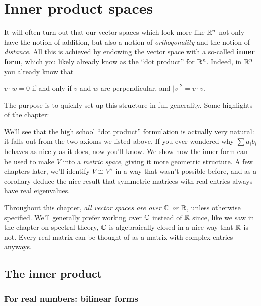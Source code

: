\chapter{Inner product spaces}
It will often turn out that our vector spaces which look more like $\mathbb R^n$
not only have the notion of addition, but also a notion of \emph{orthogonality}
and the notion of \emph{distance}.
All this is achieved by endowing the vector space with a so-called \textbf{inner form},
which you likely already know as the ``dot product'' for $\mathbb R^n$.
Indeed, in $\mathbb R^n$ you already know that
\begin{itemize}
	\ii $v \cdot w = 0$ if and only if $v$ and $w$ are perpendicular, and
	\ii $|v|^2 = v \cdot v$.
\end{itemize}
The purpose is to quickly set up this structure in full generality.
Some highlights of the chapter:
\begin{itemize}
	\ii We'll see that the high school ``dot product''
	formulation is actually very natural:
	it falls out from the two axioms we listed above.
	If you ever wondered why $\sum a_i b_i$ behaves as nicely as it does,
	now you'll know.
	\ii We show how the inner form can be used to make $V$ into a \emph{metric space},
	giving it more geometric structure.
	\ii A few chapters later,
	we'll identify $V \cong V^\vee$ in a way that wasn't possible before,
	and as a corollary deduce the nice result that
	symmetric matrices with real entries
	always have real eigenvalues.
\end{itemize}

Throughout this chapter, \emph{all vector spaces are over $\mathbb C$ or $\mathbb R$},
unless otherwise specified.
We'll generally prefer working over $\mathbb C$ instead of $\mathbb R$ since,
like we saw in the chapter on spectral theory, $\mathbb C$ is algebraically closed
in a nice way that $\mathbb R$ is not.
Every real matrix can be thought of as a matrix with complex entries anyways.

\section{The inner product}
\subsection{For real numbers: bilinear forms}

